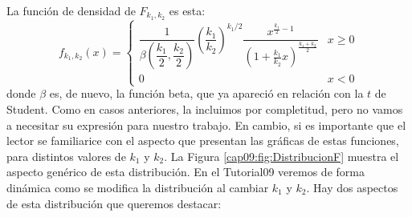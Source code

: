 La función de densidad de $F_{k_1,k_2}$ es esta:
    \[f_{k_1,k_2}(x)=
        \begin{cases}
        \dfrac{1}{\beta\left(\dfrac{k_1}{2},\dfrac{k_2}{2}\right)}\left(\dfrac{k_1}{k_2}\right)^{k_1/2}\dfrac{x^{\frac{k_1}{2}-1}}{\left(1+\frac{k_1}{k_2}x\right)^{\frac{k_1+k_2}{2}}}&x\geq 0\\[6mm]
        0&x<0
        \end{cases}
    \]
donde $\beta$ es, de nuevo, la función beta, que ya apareció en relación con la $t$ de Student.
Como en casos anteriores, la incluimos por completitud, pero no vamos a necesitar su expresión para
nuestro trabajo. En cambio, si es importante que el lector se familiarice con el aspecto que
presentan las gráficas de estas funciones, para distintos valores de $k_1$ y $k_2$. La Figura
\ref{cap09:fig:DistribucionF} muestra el aspecto genérico de esta distribución. En el Tutorial09 veremos de forma dinámica como se modifica la distribución al cambiar $k_1$ y $k_2$.
Hay dos aspectos de esta distribución que queremos destacar:

